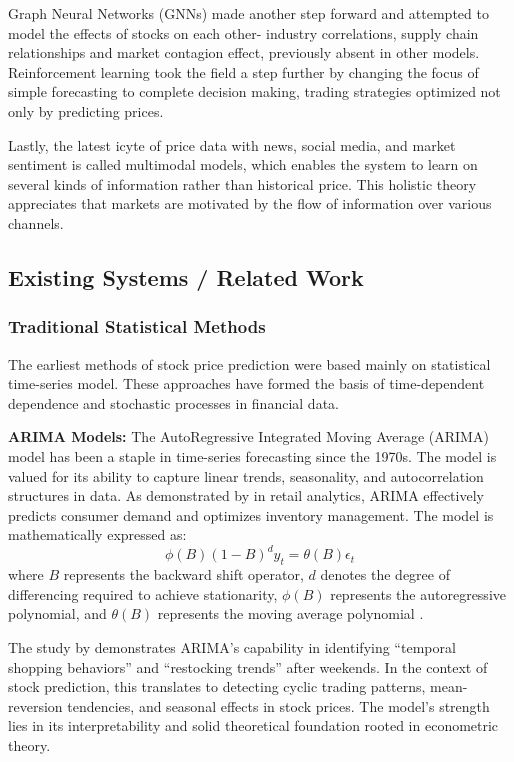 Graph Neural Networks (GNNs) made another step forward and attempted to model the effects of stocks on each other- industry correlations, supply chain relationships and market contagion effect, previously absent in other models. Reinforcement learning took the field a step further by changing the focus of simple forecasting to complete decision making, trading strategies optimized not only by predicting prices.

Lastly, the latest icyte of price data with news, social media, and market sentiment is called multimodal models, which enables the system to learn on several kinds of information rather than historical price. This holistic theory appreciates that markets are motivated by the flow of information over various channels.

\subsection{Existing Systems / Related Work}

\subsubsection{Traditional Statistical Methods}

The earliest methods of stock price prediction were based mainly on statistical time-series model. These approaches have formed the basis of time-dependent dependence and stochastic processes in financial data.

\textbf{ARIMA Models:}
The AutoRegressive Integrated Moving Average (ARIMA) model has been a staple in time-series forecasting since the 1970s. The model is valued for its ability to capture linear trends, seasonality, and autocorrelation structures in data. As demonstrated by \cite{supermarket2025} in retail analytics, ARIMA effectively predicts consumer demand and optimizes inventory management. The model is mathematically expressed as:
\begin{equation}
\phi(B)(1-B)^d y_t = \theta(B) \epsilon_t
\end{equation}
where $B$ represents the backward shift operator, $d$ denotes the degree of differencing required to achieve stationarity, $\phi(B)$ represents the autoregressive polynomial, and $\theta(B)$ represents the moving average polynomial \cite{supermarket2025}.

The study by \cite{supermarket2025} demonstrates ARIMA's capability in identifying ``temporal shopping behaviors'' and ``restocking trends'' after weekends. In the context of stock prediction, this translates to detecting cyclic trading patterns, mean-reversion tendencies, and seasonal effects in stock prices. The model's strength lies in its interpretability and solid theoretical foundation rooted in econometric theory.

